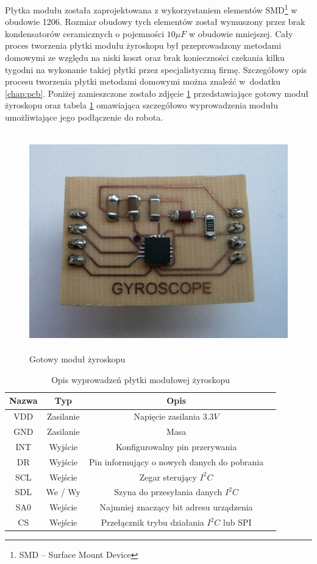 Płytka modułu została zaprojektowana z wykorzystaniem elementów
SMD\footnote{SMD -- Surface Mount Device} w obudowie 1206. Rozmiar obudowy tych
elementów został wymuszony przez brak kondensatorów ceramicznych o pojemności $10\mu F$ w obudowie mniejszej. Cały proces tworzenia
płytki modułu żyroskopu był przeprowadzony metodami domowymi ze względu na niski
koszt oraz brak konieczności czekania kilku tygodni na wykonanie takiej płytki
przez specjalistyczną firmę. Szczegółowy opis procesu tworzenia płytki metodami
domowymi można znaleźć w~dodatku \ref{chap:pcb}. Poniżej zamieszczone zostało
zdjęcie \ref{fig:L3G4200DModule} przedstawiające gotowy moduł żyroskopu oraz
tabela \ref{tab:L3G4200DModOut} omawiająca szczegółowo wyprowadzenia modułu
umożliwiające jego podłączenie do robota.
\begin{figure}[!ht]
 \centering
 \includegraphics[height=95mm]{../images/ch04/gyromodule.jpg}
 \caption{Gotowy moduł żyroskopu}
 \label{fig:L3G4200DModule}
\end{figure} 
\begin{table}[hb]
  \centering
  \caption{Opis wyprowadzeń płytki modułowej żyroskopu}
  \begin{tabular}{ | c | c | c | p{1.75cm} |} \hline
    Nazwa & Typ & Opis \\ \hline
    VDD & Zasilanie & Napięcie zasilania $3.3V$ \\
    GND & Zasilanie & Masa \\
    INT & Wyjście & Konfigurowalny pin przerywania \\
    DR  & Wyjście & Pin informujący o nowych danych do pobrania \\
    SCL & Wejście & Zegar sterujący $I^{2}C$ \\
    SDL & We / Wy & Szyna do przesyłania danych $I^{2}C$ \\
    SA0 & Wejście & Najmniej znaczący bit adresu urządzenia \\
    CS  & Wejście & Przełącznik trybu działania $I^{2}C$ lub SPI \\ \hline
  \end{tabular}
  \label{tab:L3G4200DModOut}
\end{table}